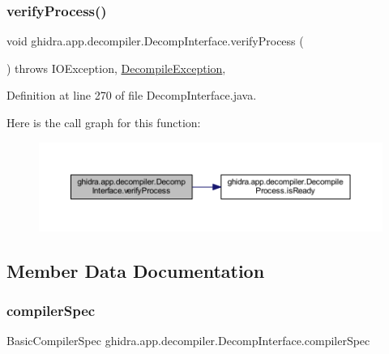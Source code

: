 \subsubsection{\texorpdfstring{verifyProcess()}{verifyProcess()}}
{\footnotesize\ttfamily void ghidra.\+app.\+decompiler.\+Decomp\+Interface.\+verify\+Process (\begin{DoxyParamCaption}{ }\end{DoxyParamCaption}) throws I\+O\+Exception, \mbox{\hyperlink{classghidra_1_1app_1_1decompiler_1_1_decompile_exception}{Decompile\+Exception}}\hspace{0.3cm}{\ttfamily [inline]}, {\ttfamily [protected]}}



Definition at line 270 of file Decomp\+Interface.\+java.

Here is the call graph for this function\+:
\nopagebreak
\begin{figure}[H]
\begin{center}
\leavevmode
\includegraphics[width=350pt]{classghidra_1_1app_1_1decompiler_1_1_decomp_interface_a4c703f5ca2f5e769e5de90d28f2924c8_cgraph}
\end{center}
\end{figure}


\subsection{Member Data Documentation}
\mbox{\label{classghidra_1_1app_1_1decompiler_1_1_decomp_interface_ad62da6d33351c1ffbe94eb85b979e1b6}} 
\subsubsection{\texorpdfstring{compilerSpec}{compilerSpec}}
{\footnotesize\ttfamily Basic\+Compiler\+Spec ghidra.\+app.\+decompiler.\+Decomp\+Interface.\+compiler\+Spec\hspace{0.3cm}{\ttfamily [protected]}}



